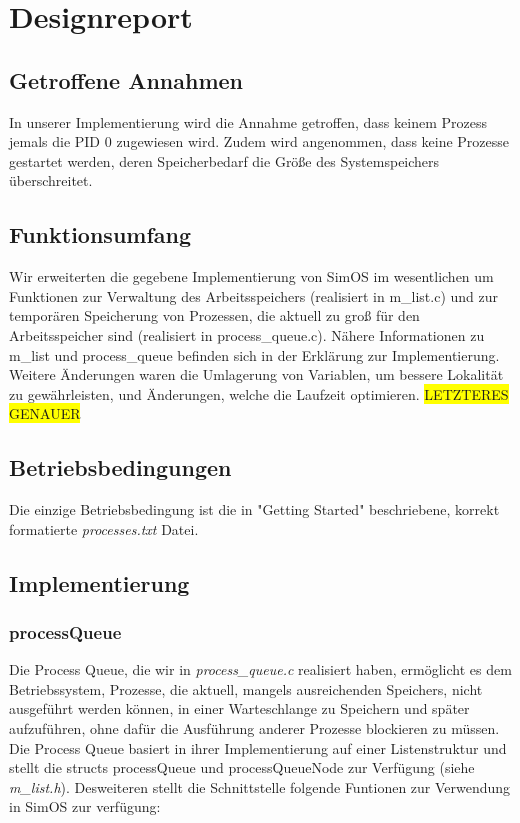 \section{Designreport}
\subsection{Getroffene Annahmen}
In unserer Implementierung wird die Annahme getroffen, dass keinem Prozess jemals die PID 0 zugewiesen wird. Zudem wird angenommen, dass keine Prozesse gestartet werden, deren Speicherbedarf die Größe des Systemspeichers überschreitet.

\subsection{Funktionsumfang}
Wir erweiterten die gegebene Implementierung von SimOS im wesentlichen um Funktionen zur Verwaltung des Arbeitsspeichers (realisiert in m\_list.c) und zur temporären Speicherung von Prozessen, die aktuell zu groß für den Arbeitsspeicher sind (realisiert in process\_queue.c).
Nähere Informationen zu m\_list und process\_queue befinden sich in der Erklärung zur Implementierung.
Weitere Änderungen waren die Umlagerung von Variablen, um bessere Lokalität zu gewährleisten, und Änderungen, welche die Laufzeit optimieren.
\colorbox{yellow}{LETZTERES GENAUER}

\subsection{Betriebsbedingungen}
Die einzige Betriebsbedingung ist die in "Getting Started" beschriebene, korrekt formatierte \textit{processes.txt} Datei.


\subsection{Implementierung}

\subsubsection{processQueue}
Die Process Queue, die wir in \textit{process\_queue.c} realisiert haben, ermöglicht es dem Betriebssystem, Prozesse, die aktuell, mangels ausreichenden Speichers, nicht ausgeführt werden können, in einer Warteschlange zu Speichern und später aufzuführen, ohne dafür die Ausführung anderer Prozesse blockieren zu müssen.
Die Process Queue basiert in ihrer Implementierung auf einer Listenstruktur und stellt die structs processQueue und processQueueNode zur Verfügung (siehe \textit{m\_list.h}).
Desweiteren stellt die Schnittstelle folgende Funtionen zur Verwendung in SimOS zur verfügung:


